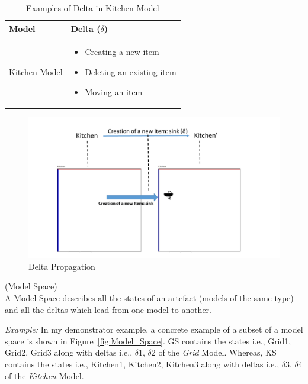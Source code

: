 \begin{table}
	\centering	
	\begin{tabular}{|p{5cm}|p{10cm}|}
		\hline
		\rowcolor[gray]{.8}	
		\textbf{Model} & \textbf{Delta ($\delta$)} \\
		\hline
		Kitchen Model & 
		\begin{itemize}
			\item Creating a new item
			\item Deleting an existing item
			\item Moving an item
		\end{itemize}\\
		\hline				
		
	\end{tabular}
	\caption{Examples of Delta in Kitchen Model}
	\label{tab:Examples_of_Delta}
\end{table}

\begin{figure}
	\includegraphics[width=1\textwidth]{figures/Delta_Propagation}
	\caption{Delta Propagation}
	\label{fig:Delta_Propagation}
\end{figure}

\begin{defn}\label{defModelSpace } (Model Space)\\
A Model Space describes all the states of an artefact (models of the same type) and all the deltas which lead from one model to another.
\end{defn}

\textit{Example:} In my demonstrator example, a concrete example of a subset of a model space is shown in Figure~\ref{fig:Model_Space}. GS contains the states i.e., Grid1, Grid2, Grid3 along with deltas i.e., $\delta$1, $\delta$2 of the \textit{Grid} Model. Whereas, KS contains the states i.e., Kitchen1, Kitchen2, Kitchen3 along with deltas i.e., $\delta$3, $\delta$4 of the \textit{Kitchen} Model.


